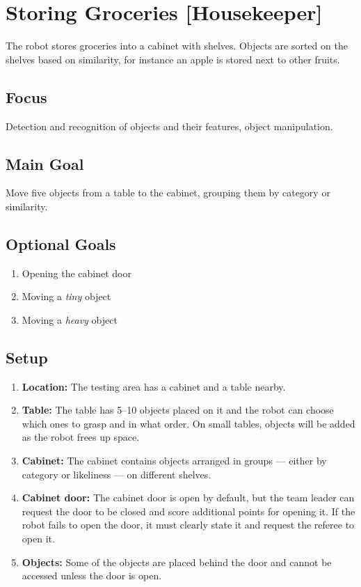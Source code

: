 \section{Storing Groceries [Housekeeper]}
\label{test:storing-groceries}
The robot stores groceries into a cabinet with shelves. Objects are sorted on the shelves based on similarity, for instance an apple is stored next to other fruits.

\subsection*{Focus}
Detection and recognition of objects and their features, object manipulation.

\subsection*{Main Goal}
Move five objects from a table to the cabinet, grouping them by category or similarity.

\subsection*{Optional Goals}
\begin{enumerate}[nosep]
	\item Opening the cabinet door
	\item Moving a \emph{tiny} object
	\item Moving a \emph{heavy} object
\end{enumerate}

%
%
\subsection*{Setup}
\begin{enumerate}
	\item \textbf{Location:} The testing area has a cabinet and a table nearby.
	\item \textbf{Table:} The table has 5--10 objects placed on it and the robot can choose which ones to grasp and in what order. On small tables, objects will be added as the robot frees up space.
	\item \textbf{Cabinet:} The cabinet contains objects arranged in groups --- either by category or likeliness --- on different shelves.
	\item \textbf{Cabinet door:} The cabinet door is open by default, but the team leader can request the door to be closed and score additional points for opening it. If the robot fails to open the door, it must clearly state it and request the referee to open it.
	\item \textbf{Objects:} Some of the objects are placed behind the door and cannot be accessed unless the door is open.
\end{enumerate}


